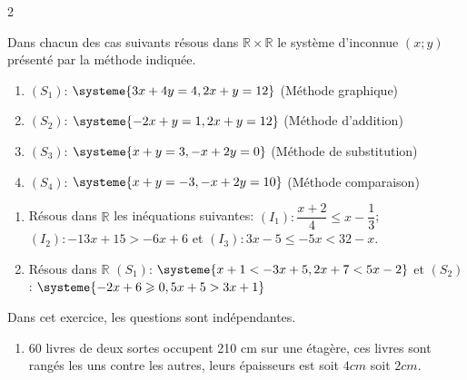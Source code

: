 \begin{multicols*}{2}
  	\begin{center}
  	\end{center}
  	\begin{center}
  	\end{center}
  	Dans chacun des cas suivants résous  dans $\mathbb{R}\times \mathbb{R}$ le système d'inconnue $(x;y)$ présenté par la méthode indiquée.
  	\begin{enumerate}
  		\item  $(S_{1})$: $\systeme{3x+4y=4 , 2x+y=12 }$ (Méthode graphique)
  		\item  $(S_{2})$: $\systeme{-2x+y=1 , 2x+y=12 }$ (Méthode d'addition)
  		\item  $(S_{3})$: $\systeme{x+y=3 , -x+2y=0 }$ (Méthode de substitution)
  		\item  $(S_{4})$: $\systeme{x+y=-3 , -x+2y=10 }$ (Méthode comparaison)
  	\end{enumerate}
  	\begin{center}
  	\end{center}
  	\begin{enumerate}
  		\item Résous dans $\mathbb{R}$ les inéquations suivantes:   $(I_{1}): \dfrac{x+2}{4}\leqslant x-\dfrac{1}{3}$; $(I_{2}): -13x+15>-6x+6$ et  $(I_{3}): 3x-5\leqslant -5x<32-x$.
  		\item Résous dans $\mathbb{R}$ $(S_{1})$: $\systeme{x+1<-3x+5 , 2x+7<5x-2 }$ et 
  		$(S_{2})$: $\systeme{-2x+6\geqslant 0 , 5x+5>3x+1 }$ 
  	\end{enumerate}
  	\begin{center}
  	\end{center}
  	Dans cet exercice, les questions sont indépendantes. 
  	\begin{enumerate}
  		\item $60$ livres de deux sortes occupent 210 cm sur une étagère, ces 
  		livres sont rangés les uns contre les autres, leurs épaisseurs est 
  		soit $4 cm$ soit $2 cm$. 
  		

\end{enumerate}
\end{multicols*}
